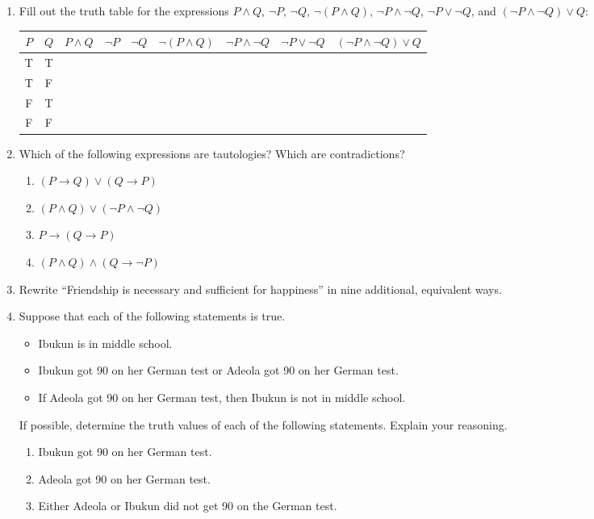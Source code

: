 \documentclass[12pt]{article}
\begin{document}
\begin{enumerate}
\begin{enumerate}
  \end{enumerate}
  

\item Fill out the truth table for the expressions
  $P\wedge Q$, $\lnot P$, $\lnot Q$, $\lnot(P\wedge Q)$, $\lnot P\wedge\lnot Q$, $\lnot P\vee\lnot Q$, and 
   $(\lnot P\wedge\lnot Q)\vee Q$:

  \begin{tabular}{|c|c||c|c|c|c|c|c|c|}\hline
    $P$&$Q$&$P\wedge Q$&$\lnot P$& $\lnot Q$& $\lnot(P\wedge Q)$& $\lnot P\wedge\lnot Q$& $\lnot P\vee\lnot Q$
      &  $(\lnot P\wedge\lnot Q)\vee Q$\\ \hline\hline
     T &T&&&&&&&\\
     T &F&&&&&&&\\
     F &T&&&&&&&\\
     F &F&&&&&&&
    \end{tabular}\medskip
  
\item  Which of the following expressions are tautologies?  Which are contradictions?
  \begin{enumerate}
    
   \item $(P \to Q)\vee(Q\to P)$
   \item $(P\wedge Q)\vee(\lnot P\wedge \lnot Q)$
   \item $P\to (Q\to P)$
   \item $(P\wedge Q)\wedge(Q\to\lnot P)$
    
  \end{enumerate}

\item  Rewrite ``Friendship is necessary and sufficient for happiness'' in nine additional, equivalent ways.


\item Suppose that each of the following statements is true.
  \begin{itemize}
  \item Ibukun is in middle school.
  \item Ibukun got 90 on her German test or  Adeola got 90 on her German test.
  \item If Adeola got 90 on her German test, then Ibukun is not in middle school.
  \end{itemize}
  If possible, determine the truth values of each of the following statements.  Explain your reasoning.
  \begin{enumerate}
   \item  Ibukun  got 90 on her German test.
   \item  Adeola  got 90 on her German test.
   \item  Either Adeola or Ibukun did not get 90 on the German test.
  \end{enumerate}
 

\end{enumerate}
\end{document}
